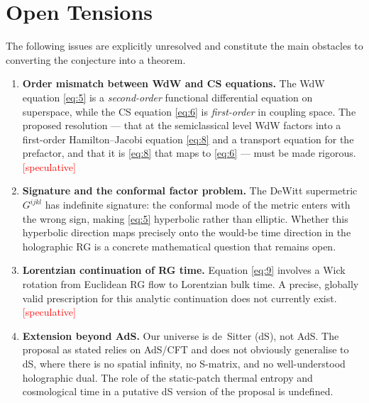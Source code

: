 \documentclass[11pt,a4paper]{article}
\begin{document}
\section{Open Tensions}

The following issues are explicitly unresolved and constitute the main
obstacles to converting the conjecture into a theorem.

\begin{enumerate}
  \item \textbf{Order mismatch between WdW and CS equations.}
    The WdW equation \eqref{eq:5} is a \emph{second-order} functional
    differential equation on superspace, while the CS equation \eqref{eq:6}
    is \emph{first-order} in coupling space.
    The proposed resolution --- that at the semiclassical level WdW factors
    into a first-order Hamilton--Jacobi equation \eqref{eq:8} and a transport
    equation for the prefactor, and that it is \eqref{eq:8} that maps to
    \eqref{eq:6} --- must be made rigorous.
    \textcolor{red}{[speculative]}

  \item \textbf{Signature and the conformal factor problem.}
    The DeWitt supermetric $G^{ijkl}$ has indefinite signature: the
    conformal mode of the metric enters with the wrong sign, making \eqref{eq:5}
    hyperbolic rather than elliptic.
    Whether this hyperbolic direction maps precisely onto the would-be time
    direction in the holographic RG is a concrete mathematical question
    that remains open.

  \item \textbf{Lorentzian continuation of RG time.}
    Equation \eqref{eq:9} involves a Wick rotation from Euclidean RG flow to
    Lorentzian bulk time.
    A precise, globally valid prescription for this analytic continuation does
    not currently exist.
    \textcolor{red}{[speculative]}

  \item \textbf{Extension beyond AdS.}
    Our universe is de~Sitter (dS), not AdS.
    The proposal as stated relies on AdS/CFT \cite{maldacena1997,witten1998}
    and does not obviously generalise to dS, where there is no spatial
    infinity, no S-matrix, and no well-understood holographic dual.
    The role of the static-patch thermal entropy and cosmological time in a
    putative dS version of the proposal is undefined.


\end{enumerate}
\end{document}
